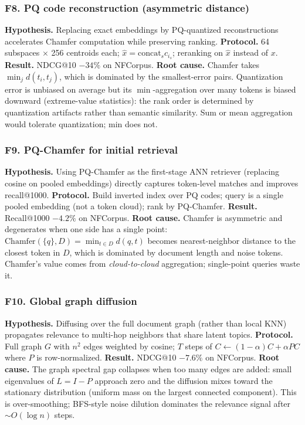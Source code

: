 \documentclass[review,1p,11pt]{elsarticle}
\begin{document}
\subsubsection*{F8. PQ code reconstruction (asymmetric distance)}
\textbf{Hypothesis.} Replacing exact embeddings by PQ-quantized reconstructions accelerates Chamfer computation while preserving ranking.
\textbf{Protocol.} 64 subspaces $\times$ 256 centroids each; $\hat{x} = \mathrm{concat}_s c_{i_s}$; reranking on $\hat{x}$ instead of $x$.
\textbf{Result.} NDCG@10 $-34\%$ on NFCorpus.
\textbf{Root cause.} Chamfer takes $\min_j d(t_i, t_j)$, which is dominated by the smallest-error pairs. Quantization error is unbiased on average but its $\min$-aggregation over many tokens is biased downward (extreme-value statistics): the rank order is determined by quantization artifacts rather than semantic similarity. Sum or mean aggregation would tolerate quantization; min does not.

\subsubsection*{F9. PQ-Chamfer for initial retrieval}
\textbf{Hypothesis.} Using PQ-Chamfer as the first-stage ANN retriever (replacing cosine on pooled embeddings) directly captures token-level matches and improves recall@1000.
\textbf{Protocol.} Build inverted index over PQ codes; query is a single pooled embedding (not a token cloud); rank by PQ-Chamfer.
\textbf{Result.} Recall@1000 $-4.2\%$ on NFCorpus.
\textbf{Root cause.} Chamfer is asymmetric and degenerates when one side has a single point: $\mathrm{Chamfer}(\{q\}, D) = \min_{t \in D} d(q,t)$ becomes nearest-neighbor distance to the closest token in $D$, which is dominated by document length and noise tokens. Chamfer's value comes from \emph{cloud-to-cloud} aggregation; single-point queries waste it.

\subsubsection*{F10. Global graph diffusion}
\textbf{Hypothesis.} Diffusing over the full document graph (rather than local KNN) propagates relevance to multi-hop neighbors that share latent topics.
\textbf{Protocol.} Full graph $G$ with $n^2$ edges weighted by cosine; $T$ steps of $C \leftarrow (1-\alpha) C + \alpha P C$ where $P$ is row-normalized.
\textbf{Result.} NDCG@10 $-7.6\%$ on NFCorpus.
\textbf{Root cause.} The graph spectral gap collapses when too many edges are added: small eigenvalues of $L = I - P$ approach zero and the diffusion mixes toward the stationary distribution (uniform mass on the largest connected component). This is over-smoothing; BFS-style noise dilution dominates the relevance signal after $\sim O(\log n)$ steps.
\end{document}
